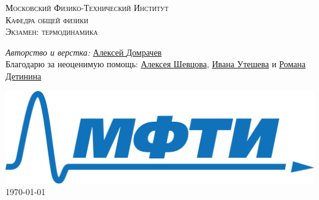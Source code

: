 
	\begin{titlepage}
		

		
		
		\center %
		
		
		
		
		\textsc{\LARGE Московский Физико-Технический Институт}\\[1,5cm] %
		\textsc{\Large Кафедра общей физики}\\[0.5cm]
		\textsc{\large Экзамен: термодинамика}\\[0.5cm] %
		
		

		
		
		
		
			\begin{center} \large
				\emph{Авторство и верстка:} \href{https://vk.com/domrachev_alexey}{Алексей \textsf{Домрачев}}\\
				Благодарю за неоценимую помощь: \href{https://vk.com/shevtsovalexey}{Алексея \textsf{Шевцова}}, \href{https://vk.com/uteshevia}{Ивана \textsf{Утешева}} и \href{https://vk.com/detinin_roman}{Романа \textsf{Детинина}}
			\end{center}

		
		
		\begin{bottompar}
			\includegraphics[width = 80 mm]{logo.png}	\\[1,0cm]
			{\large \today}
		\end{bottompar}
		\vfill %
		
	\end{titlepage}

